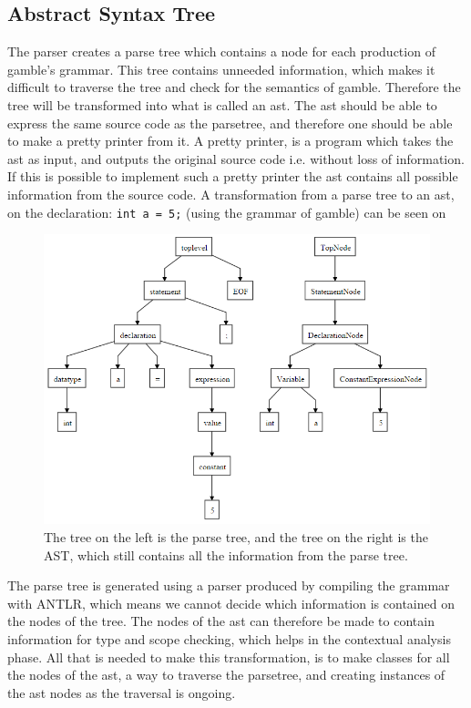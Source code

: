 \subsection*{Abstract Syntax Tree}\label{sec:AST}
The parser creates a parse tree which contains a node for each production of \gls{gamble}'s grammar.
This tree contains unneeded information, which makes it difficult to traverse the tree and check for the semantics of \gls{gamble}.
Therefore the tree will be transformed into what is called an \acrfull{ast}.
The \acrshort{ast} should be able to express the same source code as the parsetree, and therefore one should be able to make a pretty printer from it.
A pretty printer, is a program which takes the \acrshort{ast} as input, and outputs the original source code i.e. without loss of information.
If this is possible to implement such a pretty printer the \acrshort{ast} contains all possible information from the source code.
A transformation from a parse tree to an \acrshort{ast}, on the declaration: \texttt{int a = 5;} (using the grammar of \gls{gamble}) can be seen on 

\begin{figure}
		\centering
	 	\includegraphics[width=0.8\linewidth]{figures/Trees/AST.PNG}
		\caption{The tree on the left is the parse tree, and the tree on the right is the AST, which still contains all the information from the parse tree.}\label{image:AST}
\end{figure}

The parse tree is generated using a parser produced by compiling the grammar with ANTLR, which means we cannot decide which information is contained on the nodes of the tree.
The nodes of the \acrshort{ast} can therefore be made to contain information for type and scope checking, which helps in the contextual analysis phase.
All that is needed to make this transformation, is to make classes for all the nodes of the \acrshort{ast}, a way to traverse the parsetree, and creating instances of the \acrshort{ast} nodes as the traversal is ongoing.




